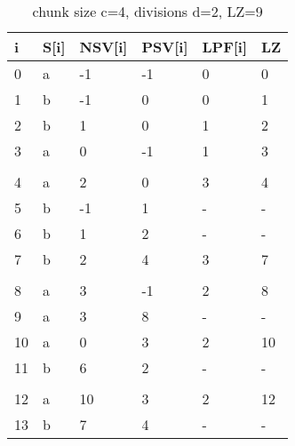 \begin{table}[h]
\centering
\begin{tabular}{@{}llllll@{}}
\toprule
i  & S{[}i{]} & NSV{[}i{]} & PSV{[}i{]} & LPF{[}i{]} & LZ \\ \midrule
0  & a        & -1         & -1         & 0          & 0  \\
1  & b        & -1         & 0          & 0          & 1  \\
2  & b        & 1          & 0          & 1          & 2  \\
3  & a        & 0          & -1         & 1          & 3  \\
   &          &            &            &            &    \\
4  & a        & 2          & 0          & 3          & 4  \\
5  & b        & -1         & 1          & -          & -  \\
6  & b        & 1          & 2          & -          & -  \\
7  & b        & 2          & 4          & 3          & 7  \\
   &          &            &            &            &    \\
8  & a        & 3          & -1         & 2          & 8  \\
9  & a        & 3          & 8          & -          & -  \\
10 & a        & 0          & 3          & 2          & 10 \\
11 & b        & 6          & 2          & -          & -  \\
   &          &            &            &            &    \\
12 & a        & 10         & 3          & 2          & 12 \\
13 & b        & 7          & 4          & -          & -  \\ \bottomrule
\end{tabular}
\caption{chunk size c=4, divisions d=2, LZ=9}
\label{tab:example4}
\end{table}

